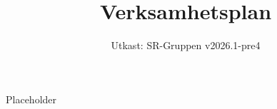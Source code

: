 \documentclass[a4paper]{dtek}
\title{Verksamhetsplan}
\date{Utkast: SR-Gruppen v2026.1-pre4}
\begin{document}
Placeholder
\end{document}
